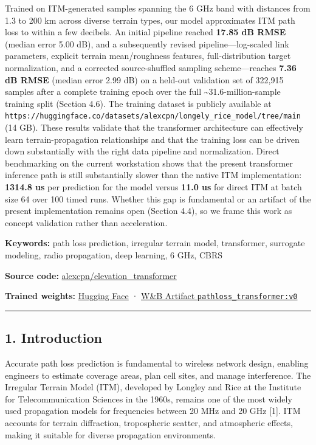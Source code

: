 \documentclass[
]{article}
\begin{document}
Trained on ITM-generated samples spanning the 6 GHz band with distances
from 1.3 to 200 km across diverse terrain types, our model approximates
ITM path loss to within a few decibels. An initial pipeline reached
\textbf{17.85 dB RMSE} (median error 5.00 dB), and a subsequently
revised pipeline---log-scaled link parameters, explicit terrain
mean/roughness features, full-distribution target normalization, and a
corrected source-shuffled sampling scheme---reaches \textbf{7.36 dB
RMSE} (median error 2.99 dB) on a held-out validation set of 322,915
samples after a complete training epoch over the full
\textasciitilde31.6-million-sample training split (Section 4.6). The
training dataset is publicly available at
\texttt{https://huggingface.co/datasets/alexcpn/longely\_rice\_model/tree/main}
(14 GB). These results validate that the transformer architecture can
effectively learn terrain-propagation relationships and that the
training loss can be driven down substantially with the right data
pipeline and normalization. Direct benchmarking on the current
workstation shows that the present transformer inference path is still
substantially slower than the native ITM implementation: \textbf{1314.8
us} per prediction for the model versus \textbf{11.0 us} for direct ITM
at batch size 64 over 100 timed runs. Whether this gap is fundamental or
an artifact of the present implementation remains open (Section 4.4), so
we frame this work as concept validation rather than acceleration.

\textbf{Keywords:} path loss prediction, irregular terrain model,
transformer, surrogate modeling, radio propagation, deep learning, 6
GHz, CBRS

\textbf{Source code:}
\href{https://github.com/alexcpn/elevation_transformer}{alexcpn/elevation\_transformer}

\textbf{Trained weights:}
\href{https://huggingface.co/alexcpn/elevation_transformer}{Hugging
Face} ·
\href{https://wandb.ai/alexcpn/elevation_transformer/artifacts/model/pathloss_transformer/v0/overview}{W\&B
Artifact \texttt{pathloss\_transformer:v0}}

\begin{center}\rule{0.5\linewidth}{0.5pt}\end{center}

\subsection{1. Introduction}\label{introduction}

Accurate path loss prediction is fundamental to wireless network design,
enabling engineers to estimate coverage areas, plan cell sites, and
manage interference. The Irregular Terrain Model (ITM), developed by
Longley and Rice at the Institute for Telecommunication Sciences in the
1960s, remains one of the most widely used propagation models for
frequencies between 20 MHz and 20 GHz {[}1{]}. ITM accounts for terrain
diffraction, tropospheric scatter, and atmospheric effects, making it
suitable for diverse propagation environments.
\end{document}
